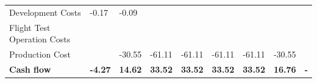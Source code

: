 \begin{table}[h]
\begin{tabular}{l|llllllll}
Development Costs           & -0.17 & -0.09  &        &        &        &        &        &       \\
Flight Test Operation Costs &       &        &        &        &        &        &        &       \\
Production Cost             &       & -30.55 & -61.11 & -61.11 & -61.11 & -61.11 & -30.55 &       \\ \midrule
\textbf{Cash flow} & \textbf{-4.27} & \textbf{14.62} & \textbf{33.52} & \textbf{33.52} & \textbf{33.52} & \textbf{33.52} & \textbf{16.76} & \textbf{-} \\ \bottomrule
\end{tabular}
\end{table}


